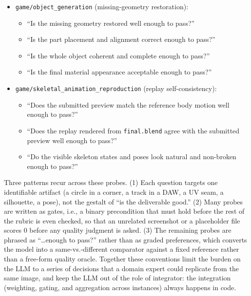 \begin{itemize}[nosep,leftmargin=1.2em]
    \begin{itemize}[nosep,leftmargin=1.2em]
        \item ``Does the candidate preserve the overall highpoly shape well enough to pass?''
        \item ``Does the candidate preserve the main silhouettes across the sampled views well enough to pass?''
        \item ``Does the candidate achieve a meaningful lowpoly reduction rather than effectively submitting the highpoly again?''
        \item ``Are obvious visual artifacts or shape collapses absent enough for the result to pass?''
    \end{itemize}
    \item \texttt{game/object\_generation} (missing-geometry restoration):
    \begin{itemize}[nosep,leftmargin=1.2em]
        \item ``Is the missing geometry restored well enough to pass?''
        \item ``Is the part placement and alignment correct enough to pass?''
        \item ``Is the whole object coherent and complete enough to pass?''
        \item ``Is the final material appearance acceptable enough to pass?''
    \end{itemize}
    \item \texttt{game/skeletal\_animation\_reproduction} (replay self-consistency):
    \begin{itemize}[nosep,leftmargin=1.2em]
        \item ``Does the submitted preview match the reference body motion well enough to pass?''
        \item ``Does the replay rendered from \texttt{final.blend} agree with the submitted preview well enough to pass?''
        \item ``Do the visible skeleton states and poses look natural and non-broken enough to pass?''
    \end{itemize}
\end{itemize}

\noindent Three patterns recur across these probes. (1) Each question targets one identifiable artifact (a circle in a corner, a track in a DAW, a UV seam, a silhouette, a pose), not the gestalt of ``is the deliverable good.'' (2) Many probes are written as gates, i.e., a binary precondition that must hold before the rest of the rubric is even checked, so that an unrelated screenshot or a placeholder file scores $0$ before any quality judgment is asked. (3) The remaining probes are phrased as ``\dots enough to pass?'' rather than as graded preferences, which converts the model into a same-vs.-different comparator against a fixed reference rather than a free-form quality oracle. Together these conventions limit the burden on the LLM to a series of decisions that a domain expert could replicate from the same image, and keep the LLM out of the role of integrator: the integration (weighting, gating, and aggregation across instances) always happens in code.

